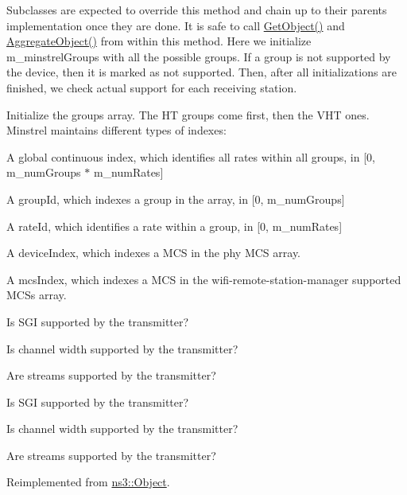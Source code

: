 Subclasses are expected to override this method and chain up to their parent\textquotesingle{}s implementation once they are done. It is safe to call \hyperlink{classns3_1_1Object_a13e18c00017096c8381eb651d5bd0783}{Get\+Object()} and \hyperlink{classns3_1_1Object_a79dd435d300f3deca814553f561a2922}{Aggregate\+Object()} from within this method. Here we initialize m\+\_\+minstrel\+Groups with all the possible groups. If a group is not supported by the device, then it is marked as not supported. Then, after all initializations are finished, we check actual support for each receiving station.

Initialize the groups array. The HT groups come first, then the V\+HT ones. Minstrel maintains different types of indexes\+:
\begin{DoxyItemize}
\item A global continuous index, which identifies all rates within all groups, in \mbox{[}0, m\+\_\+num\+Groups $\ast$ m\+\_\+num\+Rates\mbox{]}
\item A group\+Id, which indexes a group in the array, in \mbox{[}0, m\+\_\+num\+Groups\mbox{]}
\item A rate\+Id, which identifies a rate within a group, in \mbox{[}0, m\+\_\+num\+Rates\mbox{]}
\item A device\+Index, which indexes a M\+CS in the phy M\+CS array.
\item A mcs\+Index, which indexes a M\+CS in the wifi-\/remote-\/station-\/manager supported M\+C\+Ss array.
\end{DoxyItemize}

Is S\+GI supported by the transmitter?

Is channel width supported by the transmitter?

Are streams supported by the transmitter?

Is S\+GI supported by the transmitter?

Is channel width supported by the transmitter?

Are streams supported by the transmitter? 

Reimplemented from \hyperlink{classns3_1_1Object_af8482a521433409fb5c7f749398c9dbe}{ns3\+::\+Object}.


